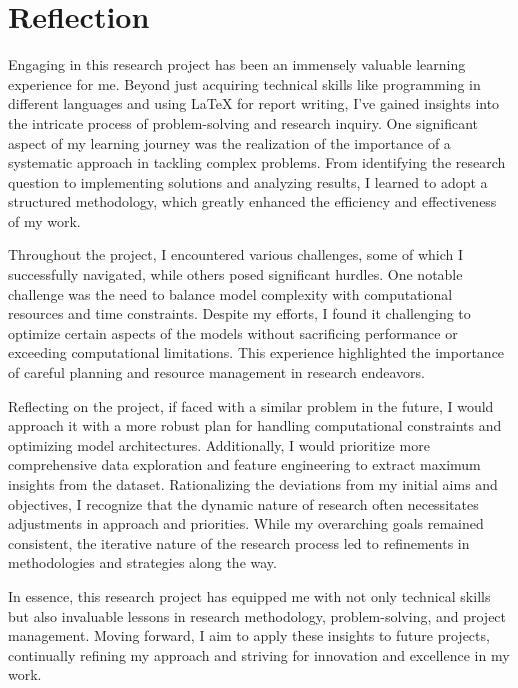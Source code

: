 \chapter{Reflection}
\label{ch:reflection}
Engaging in this research project has been an immensely valuable learning experience for me. Beyond just acquiring technical skills like programming in different languages and using LaTeX for report writing, I've gained insights into the intricate process of problem-solving and research inquiry. One significant aspect of my learning journey was the realization of the importance of a systematic approach in tackling complex problems. From identifying the research question to implementing solutions and analyzing results, I learned to adopt a structured methodology, which greatly enhanced the efficiency and effectiveness of my work.

Throughout the project, I encountered various challenges, some of which I successfully navigated, while others posed significant hurdles. One notable challenge was the need to balance model complexity with computational resources and time constraints. Despite my efforts, I found it challenging to optimize certain aspects of the models without sacrificing performance or exceeding computational limitations. This experience highlighted the importance of careful planning and resource management in research endeavors.

Reflecting on the project, if faced with a similar problem in the future, I would approach it with a more robust plan for handling computational constraints and optimizing model architectures. Additionally, I would prioritize more comprehensive data exploration and feature engineering to extract maximum insights from the dataset. Rationalizing the deviations from my initial aims and objectives, I recognize that the dynamic nature of research often necessitates adjustments in approach and priorities. While my overarching goals remained consistent, the iterative nature of the research process led to refinements in methodologies and strategies along the way.

In essence, this research project has equipped me with not only technical skills but also invaluable lessons in research methodology, problem-solving, and project management. Moving forward, I aim to apply these insights to future projects, continually refining my approach and striving for innovation and excellence in my work.